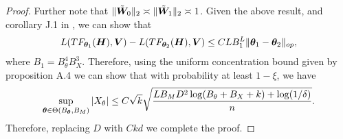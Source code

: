 \begin{proof}
    Further note that $\Vert\tilde{\boldsymbol{W}}_0\Vert_2\asymp\Vert\tilde{\boldsymbol{W}}_1\Vert_2\asymp 1$.
    Given the above result, and corollary J.1 in \citep{bai2024transformers}, we can show that
    \begin{align*}
        L(TF_{\boldsymbol{\theta}_1}(\boldsymbol{H}),\boldsymbol{V})-L(TF_{\boldsymbol{\theta}_2}(\boldsymbol{H}),\boldsymbol{V})\leq C L B_1^{L}\Vert\boldsymbol{\theta}_1-\boldsymbol{\theta}_2\Vert_{op},
    \end{align*}
    where $B_1 = B^4_{\theta}B^3_{X}$.
    Therefore, using the uniform concentration bound given by proposition A.4 we can show that with probability at least $1-\xi$, we have
    \begin{align*}
        \sup_{\boldsymbol{\theta}\in\Theta(B_{\boldsymbol{\theta}},B_M)} |X_{\theta}|\leq C\sqrt k\sqrt{\frac{LB_MD^2\log(B_{\theta}+B_X+k)+\log(1/\delta)}{n}}.
    \end{align*}
    Therefore, replacing $D$ with $Ckd$ we complete the proof.
\end{proof}

